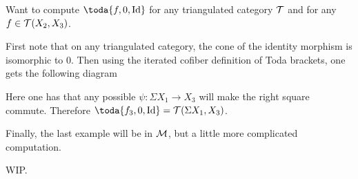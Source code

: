 \begin{example}
	Want to compute \( \toda{f, 0, \Id} \) for any triangulated category \( {\mathcal{T}} \) and for any \( f \in {\mathcal{T}}(X_2, X_3) \).

	First note that on any triangulated category, the cone of the identity morphism is isomorphic to \( 0 \). Then using the iterated cofiber definition of Toda brackets, one gets the following diagram
	\begin{center}
	\end{center}

	Here one has that any possible \( \psi: \Sigma X_1 \to X_3 \) will make the right square commute. Therefore \( \toda{f_3, 0, \Id} = \Tc(\Sigma X_1, X_3) \).
\end{example}

Finally, the last example will be in \( {\mathcal{M}} \), but a little more complicated computation.

WIP.
